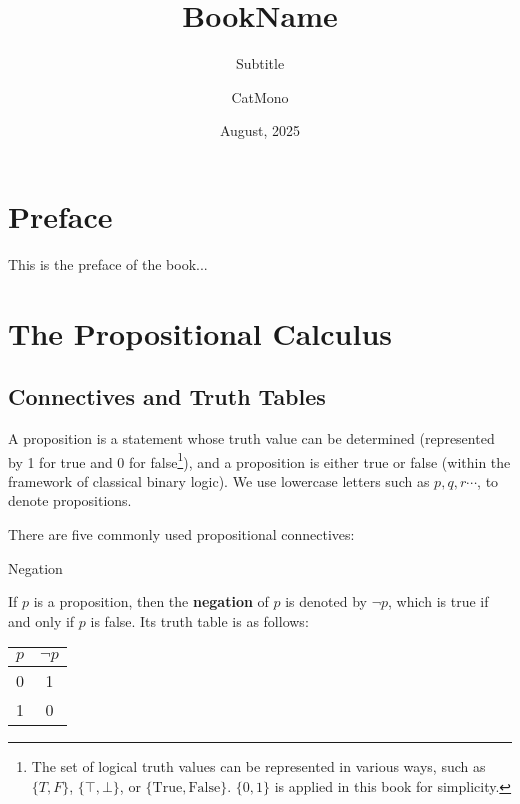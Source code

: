 \documentclass[11pt]{elegantbook}
\title{BookName} %
\subtitle{Subtitle} %
\author{CatMono} %
\date{August, 2025} %
\institute{Elegant\LaTeX{} Program} %
\begin{document}
\maketitle %

\frontmatter        %
\tableofcontents    %

\chapter{Preface}   %
This is the preface of the book...

\mainmatter         %

\chapter{The Propositional Calculus} %
\section{Connectives and Truth Tables} %
A proposition is a statement whose truth value can be determined 
(represented by 1 for true and 0 for false\footnote{
The set of logical truth values can be represented in various ways,
such as \(\{T, F\}\), \(\{\top, \bot\}\), or \(\{\text{True}, \text{False}\}\).
\(\{ 0,1 \}\) is applied in this book for simplicity.
}), 
and a proposition is either true or false (within the framework of classical binary logic). 
We use lowercase letters such as \(p,q,r\cdots\), to denote propositions.

There are five commonly used propositional connectives:
\begin{leftbarTitle}{Negation}\end{leftbarTitle}
If \(p\) is a proposition, then the \textbf{negation} of \(p\) is denoted by \(\neg p\), 
which is true if and only if \(p\) is false.
Its truth table is as follows:
\begin{center}
\begin{tabular}{cc}
\toprule
$p$ & $\neg p$ \\ %
\midrule
0 & 1  \\ %
1 & 0  \\ %
\bottomrule
\end{tabular}
\end{center}
\end{document}
